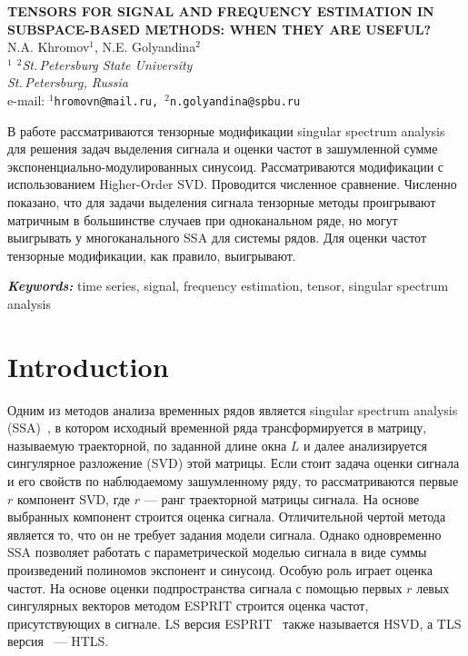 \documentclass[12pt]{article}
\providecommand{\keywords}[1]
{
  \vspace{2mm}\hspace{20pt}\textbf{\textit{Keywords:}} #1
}
\providecommand{\abskeyw}[2]
{
  \begin{small}
    \begin{adjustwidth}{10mm}{10mm}
      \vspace{1mm}\hspace{20pt}#1

      \keywords{#2}
    \end{adjustwidth}
  \end{small}
}
\theoremstyle{definition}
\theoremstyle{remark}
\begin{document}
\begin{center}
  {\Large\bf TENSORS FOR SIGNAL AND FREQUENCY ESTIMATION IN
  SUBSPACE-BASED METHODS: WHEN THEY ARE USEFUL?}\\\vspace{2mm} {\sc N.A.
  Khromov$^1$, N.E. Golyandina$^2$}\\\vspace{2mm}
  {\it $^{1}$ $^{2}$St.\,Petersburg State University\\
  St.\,Petersburg, Russia\\} e-mail: {\tt $^1$hromovn@mail.ru,
  $^2$n.golyandina@spbu.ru}

  \abskeyw{В работе рассматриваются тензорные модификации singular
    spectrum analysis для решения задач выделения сигнала и
    оценки частот в зашумленной сумме экспоненциально-модулированных
    синусоид. Рассматриваются модификации с использованием Higher-Order
    SVD. Проводится численное сравнение. Численно показано, что для
    задачи выделения сигнала тензорные методы проигрывают
    матричным в большинстве случаев при одноканальном ряде, но могут
    выигрывать у многоканального SSA для системы рядов. Для оценки частот
  тензорные модификации, как правило, выигрывают.}{time series,
  signal, frequency estimation, tensor, singular spectrum analysis}
\end{center}

\section{Introduction}

Одним из методов анализа временных рядов является singular spectrum
analysis (SSA)~\cite{Golyandina2001}, в котором исходный временной ряда
трансформируется в матрицу, называемую траекторной, по заданной длине
окна $L$ и далее анализируется сингулярное разложение (SVD) этой
матрицы. Если стоит задача оценки сигнала и его свойств по
наблюдаемому зашумленному ряду, то рассматриваются первые $r$
компонент SVD, где $r$ --- ранг траекторной матрицы сигнала. На
основе выбранных компонент строится оценка сигнала. Отличительной чертой
метода является то, что он не требует задания
модели сигнала. Однако одновременно SSA позволяет работать с
параметрической моделью сигнала в виде суммы произведений полиномов
экспонент и синусоид. Особую роль играет оценка частот. На основе
оценки подпространства сигнала с  помощью первых $r$ левых
сингулярных векторов методом ESPRIT строится оценка частот,
присутствующих в сигнале.
LS версия ESPRIT~\cite{Roy1986} также называется HSVD,
а TLS версия~\cite{Roy1989} --- HTLS.
\end{document}
